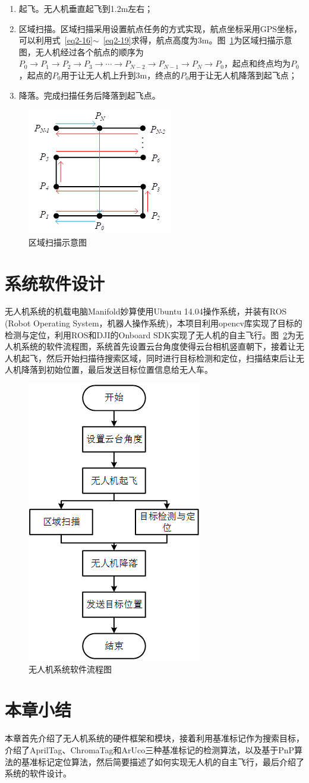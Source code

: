 \begin{enumerate}[label=(\arabic*)] 
	\item 起飞。无人机垂直起飞到1.2m左右；
	\item 区域扫描。区域扫描采用设置航点任务的方式实现，航点坐标采用GPS坐标，可以利用式~\eqref{eq2-16}$\sim$~\eqref{eq2-19}求得，航点高度为3m。图~\ref{fig:2-18}为区域扫描示意图，无人机经过各个航点的顺序为$P_0 \to P_1 \to P_2 \to P_3 \to \cdots \to P_{N-2} \to P_{N-1} \to P_N \to P_0$，起点和终点均为$P_0$，起点的$P_0$用于让无人机上升到3m，终点的$P_0$用于让无人机降落到起飞点；
	\item 降落。完成扫描任务后降落到起飞点。
\end{enumerate}

\begin{figure}[htb]
	\centering
	\includegraphics[width=0.4\linewidth]{figures/2-18.png}
	\caption{区域扫描示意图}
	\label{fig:2-18}
\end{figure}

\section{系统软件设计}
无人机系统的机载电脑Manifold妙算使用Ubuntu 14.04操作系统，并装有ROS (Robot Operating System，机器人操作系统)，本项目利用opencv库实现了目标的检测与定位，利用ROS和DJI的Onboard SDK实现了无人机的自主飞行。图~\ref{fig:2-19}为无人机系统的软件流程图，系统首先设置云台角度使得云台相机竖直朝下，接着让无人机起飞，然后开始扫描待搜索区域，同时进行目标检测和定位，扫描结束后让无人机降落到初始位置，最后发送目标位置信息给无人车。

\begin{figure}[htb]
	\centering
	\includegraphics[width=0.4\linewidth]{figures/2-19.png}
	\caption{无人机系统软件流程图}
	\label{fig:2-19}
\end{figure}

\section{本章小结}
本章首先介绍了无人机系统的硬件框架和模块，接着利用基准标记作为搜索目标，介绍了AprilTag、ChromaTag和ArUco三种基准标记的检测算法，以及基于PnP算法的基准标记定位算法，然后简要描述了如何实现无人机的自主飞行，最后介绍了系统的软件设计。


